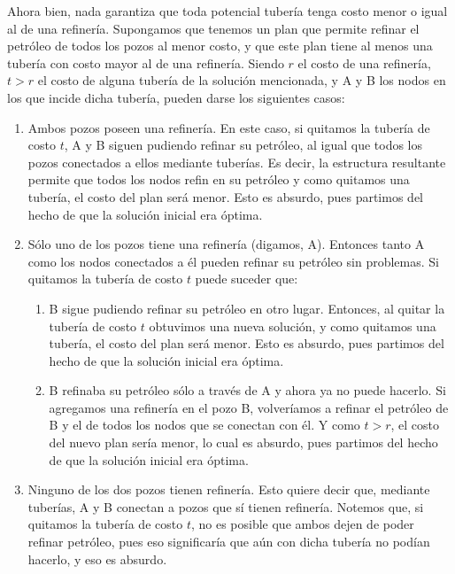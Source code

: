 Ahora bien, nada garantiza que toda potencial tubería tenga costo menor o igual al de una refinería. Supongamos que tenemos un plan que permite refinar el petróleo de todos los pozos al menor costo, y que este plan tiene al menos una tubería con costo mayor al de una refinería. Siendo $r$ el costo de una refinería, $t > r$ el costo de alguna tubería de la solución mencionada, y A y B los nodos en los que incide dicha tubería, pueden darse los siguientes casos:

\begin{enumerate}
	\item Ambos pozos poseen una refinería. En este caso, si quitamos la tubería de costo $t$, A y B siguen pudiendo refinar su petróleo, al igual que todos los pozos conectados a ellos mediante tuberías. Es decir, la estructura resultante permite que todos los nodos refin	en su petróleo y como quitamos una tubería, el costo del plan será menor.  Esto es absurdo, pues partimos del hecho de que la solución inicial era óptima.
	\item Sólo uno de los pozos tiene una refinería (digamos, A). Entonces tanto A como los nodos conectados a él pueden refinar su petróleo sin problemas. Si quitamos la tubería de costo $t$ puede suceder que:
	
	\begin{enumerate}
		\item B sigue pudiendo refinar su petróleo en otro lugar.  Entonces, al quitar la tubería de costo $t$ obtuvimos una nueva solución, y como quitamos una tubería, el costo del plan será menor.  Esto es absurdo, pues partimos del hecho de que la solución inicial era óptima.
		\item B refinaba su petróleo sólo a través de A y ahora ya no puede hacerlo. Si agregamos una refinería en el pozo B, volveríamos a refinar el petróleo de B y el de todos los nodos que se conectan con él. Y como $t > r$, el costo del nuevo plan sería menor, lo cual es absurdo, pues partimos del hecho de que la solución inicial era óptima.
	\end{enumerate}
	
	\item Ninguno de los dos pozos tienen refinería. Esto quiere decir que, mediante tuberías, A y B conectan a pozos que sí tienen refinería. Notemos que, si quitamos la tubería de costo $t$, no es posible que ambos dejen de poder refinar petróleo, pues eso significaría que aún con dicha tubería no podían hacerlo, y eso es absurdo.
	

\end{enumerate}
